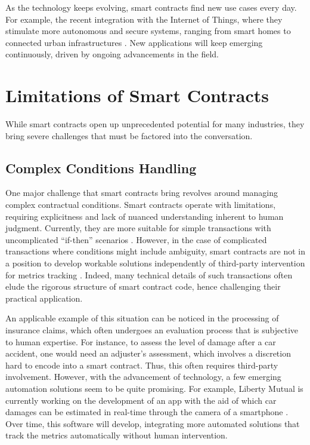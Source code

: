 As the technology keeps evolving, smart contracts find new use cases every day. For example, the recent integration with the Internet of Things, where they stimulate more autonomous and secure systems, ranging from smart homes to connected urban infrastructures \cite{SchmittEtAl2019}. New applications will keep emerging continuously, driven by ongoing advancements in the field.

\section{Limitations of Smart Contracts}

While smart contracts open up unprecedented potential for many industries, they bring severe challenges that must be factored into the conversation.

\subsection{Complex Conditions Handling}

One major challenge that smart contracts bring revolves around managing complex contractual conditions. Smart contracts operate with limitations, requiring explicitness and lack of nuanced understanding inherent to human judgment. Currently, they are more suitable for simple transactions with uncomplicated ``if-then'' scenarios \cite{Durovic2021}. However, in the case of complicated transactions where conditions might include ambiguity, smart contracts are not in a position to develop workable solutions independently of third-party intervention for metrics tracking \cite{Borselli2020}. Indeed, many technical details of such transactions often elude the rigorous structure of smart contract code, hence challenging their practical application.

An applicable example of this situation can be noticed in the processing of insurance claims, which often undergoes an evaluation process that is subjective to human expertise. For instance, to assess the level of damage after a car accident, one would need an adjuster's assessment, which involves a discretion hard to encode into a smart contract. Thus, this often requires third-party involvement. However, with the advancement of technology, a few emerging automation solutions seem to be quite promising. For example, Liberty Mutual is currently working on the development of an app with the aid of which car damages can be estimated in real-time through the camera of a smartphone \cite{Borselli2020}. Over time, this software will develop, integrating more automated solutions that track the metrics automatically without human intervention.

